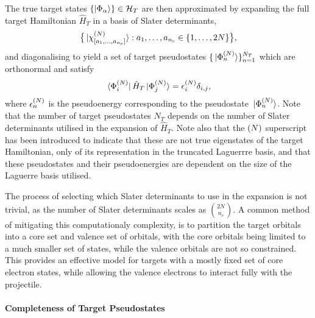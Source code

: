 \documentclass[draft]{article}
\begin{document}
The true target states
$\lbrace\ket{\Phi_{\alpha}}\rbrace \in \mathcal{H}_{T}$ are then
approximated by expanding the full target Hamiltonian $\hat{H}_{T}$ in a basis
of Slater determinants,
\begin{equation}
  \label{eq:target-slater-determinant-basis}
  \lrset[\big]
  {
    \ket*{\chi_{\lrsq{a_{1}, \dotsc, a_{n_{\mathrm{e}}}}}^{\lr{N}}}
    :
    a_{1}, \dotsc, a_{n_{\mathrm{e}}}
    \in
    \lrset{1, \dotsc, 2N}
  }
  ,
\end{equation}
and diagonalising to yield a set of target pseudostates
$\lbrace\ket*{\Phi_{n}^{(N)}}\rbrace_{n = 1}^{N_{T}}$ which are orthonormal and
satisfy
\begin{equation}
  \label{eq:target-states}
  \bra*{\Phi_{i}^{\lr{N}}}
  \hat{H}_{T}
  \ket*{\Phi_{j}^{\lr{N}}}
  =
  \epsilon_{i}^{\lr{N}}
  \delta_{i, j}
  ,
\end{equation}
where $\epsilon_{n}^{(N)}$ is the pseudoenergy corresponding to the
pseudostate $\ket*{\Phi_{n}^{(N)}}$.
Note that the number of target pseudostates $N_{T}$ depends on the number of
Slater determinants utilised in the expansion of $\hat{H}_{T}$.
Note also that the $(N)$ superscript has been introduced to indicate that
these are not true eigenstates of the target Hamiltonian, only of its
representation in the truncated Laguerrre basis, and that these pseudostates and
their pseudoenergies are dependent on the size of the Laguerre basis utilised.

The process of selecting which Slater determinants to use in the expansion is
not trivial, as the number of Slater determinants scales as
$\binom{2N}{n_{\mathrm{e}}}$.
A common method of mitigating this computationaly complexity, is to partition
the target orbitals into a core set and valence set of orbitals, with the core
orbitals being limited to a much smaller set of states, while the valence
orbitals are not so constrained.
This provides an effective model for targets with a mostly fixed set of core
electron states, while allowing the valence electrons to interact fully with the
projectile.

\paragraph{Completeness of Target Pseudostates}
\label{sec:target-states-completeness}
\end{document}
